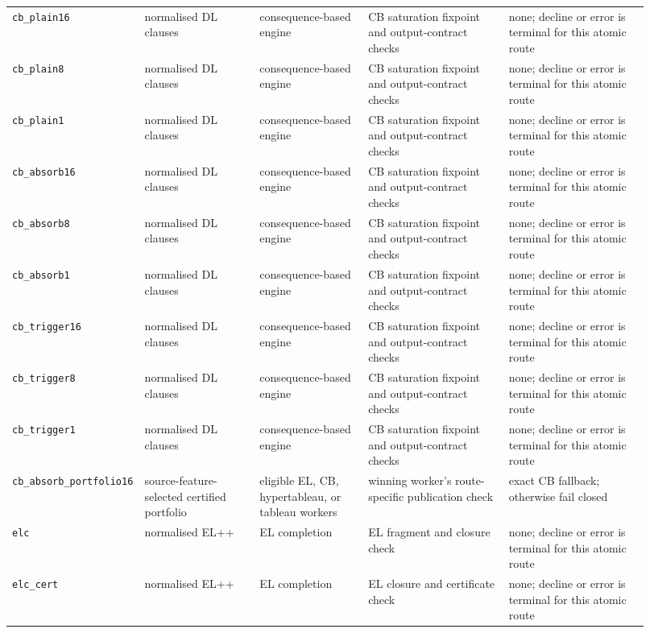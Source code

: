 \begin{longtable}{@{}p{0.13\linewidth}p{0.18\linewidth}p{0.17\linewidth}p{0.22\linewidth}p{0.22\linewidth}@{}}
\texttt{cb\_plain16} & normalised DL clauses & consequence-based engine & CB saturation fixpoint and output-contract checks & none; decline or error is terminal for this atomic route \\
\texttt{cb\_plain8} & normalised DL clauses & consequence-based engine & CB saturation fixpoint and output-contract checks & none; decline or error is terminal for this atomic route \\
\texttt{cb\_plain1} & normalised DL clauses & consequence-based engine & CB saturation fixpoint and output-contract checks & none; decline or error is terminal for this atomic route \\
\texttt{cb\_absorb16} & normalised DL clauses & consequence-based engine & CB saturation fixpoint and output-contract checks & none; decline or error is terminal for this atomic route \\
\texttt{cb\_absorb8} & normalised DL clauses & consequence-based engine & CB saturation fixpoint and output-contract checks & none; decline or error is terminal for this atomic route \\
\texttt{cb\_absorb1} & normalised DL clauses & consequence-based engine & CB saturation fixpoint and output-contract checks & none; decline or error is terminal for this atomic route \\
\texttt{cb\_trigger16} & normalised DL clauses & consequence-based engine & CB saturation fixpoint and output-contract checks & none; decline or error is terminal for this atomic route \\
\texttt{cb\_trigger8} & normalised DL clauses & consequence-based engine & CB saturation fixpoint and output-contract checks & none; decline or error is terminal for this atomic route \\
\texttt{cb\_trigger1} & normalised DL clauses & consequence-based engine & CB saturation fixpoint and output-contract checks & none; decline or error is terminal for this atomic route \\
\texttt{cb\_absorb\_portfolio16} & source-feature-selected certified portfolio & eligible EL, CB, hypertableau, or tableau workers & winning worker's route-specific publication check & exact CB fallback; otherwise fail closed \\
\texttt{elc} & normalised EL++ & EL completion & EL fragment and closure check & none; decline or error is terminal for this atomic route \\
\texttt{elc\_cert} & normalised EL++ & EL completion & EL closure and certificate check & none; decline or error is terminal for this atomic route \\

\end{longtable}
